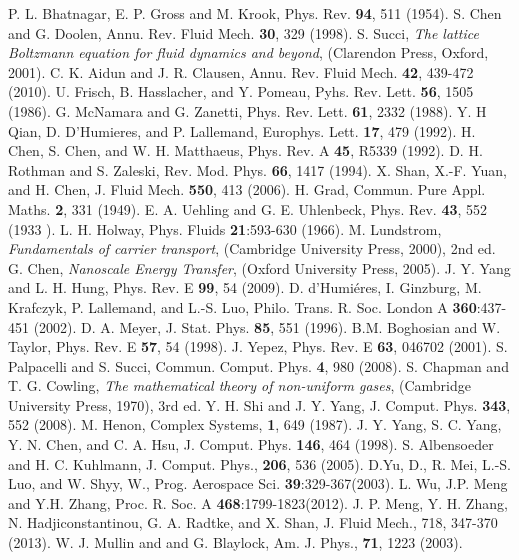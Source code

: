 \documentclass[doublecol]{epl2}
\begin{document}
\begin{thebibliography}{0}

 P. L. Bhatnagar, E. P. Gross and M. Krook, Phys. Rev. {\bf 94}, 511 (1954).
 S. Chen and G. Doolen, Annu. Rev. Fluid Mech. {\bf 30}, 329 (1998).
 S. Succi, {\sl The lattice Boltzmann equation for fluid dynamics and beyond}, (Clarendon Press, Oxford, 2001).
 C. K. Aidun and J. R. Clausen, Annu. Rev. Fluid Mech. {\bf 42}, 439-472 (2010).
 U. Frisch, B. Hasslacher, and Y. Pomeau, Pyhs. Rev. Lett. {\bf 56}, 1505 (1986).
 G. McNamara and G. Zanetti, Phys. Rev. Lett. {\bf 61}, 2332 (1988).
 Y. H Qian, D. D'Humieres, and P. Lallemand, Europhys. Lett. {\bf 17}, 479 (1992).
 H. Chen, S. Chen, and W. H. Matthaeus, Phys. Rev. A {\bf 45}, R5339 (1992).
 D. H. Rothman and S. Zaleski, Rev. Mod. Phys. {\bf 66}, 1417 (1994).
 X. Shan, X.-F. Yuan, and H. Chen, J. Fluid Mech. {\bf 550}, 413 (2006).
 H. Grad, Commun. Pure Appl. Maths. {\bf 2}, 331 (1949).
 E. A. Uehling and G. E. Uhlenbeck, Phys. Rev. {\bf 43}, 552 (1933 ).
 L. H. Holway, Phys. Fluids {\bf 21}:593-630 (1966).
 M. Lundstrom, {\sl Fundamentals of carrier transport}, (Cambridge University Press, 2000), 2nd ed.
 G. Chen, {\sl Nanoscale Energy Transfer}, (Oxford University Press, 2005).
 J. Y. Yang and L. H. Hung, Phys. Rev. E {\bf 99}, 54 (2009).
 D. d'Humi\'{e}res, I. Ginzburg, M. Krafczyk, P. Lallemand, and L.-S. Luo, Philo. Trans. R. Soc. London A {\bf 360}:437-451 (2002).
 D. A. Meyer, J. Stat. Phys. {\bf 85}, 551 (1996).
 B.M. Boghosian and W. Taylor, Phys. Rev. E {\bf 57}, 54 (1998).
 J. Yepez, Phys. Rev. E {\bf 63}, 046702 (2001).
 S. Palpacelli and S. Succi, Commun. Comput. Phys. {\bf 4}, 980 (2008).
 S. Chapman and  T. G. Cowling, {\sl The mathematical theory of non-uniform gases}, (Cambridge University Press, 1970), 3rd ed.
 Y. H. Shi and J. Y. Yang, J. Comput. Phys. {\bf 343}, 552 (2008).
 M. Henon, Complex Systems, {\bf 1}, 649 (1987).
 J. Y. Yang, S. C. Yang, Y. N. Chen, and C. A. Hsu, J. Comput. Phys. {\bf 146}, 464 (1998).
 S. Albensoeder and H. C. Kuhlmann, J. Comput. Phys., {\bf 206}, 536 (2005).
 D.Yu, D., R. Mei, L.-S. Luo, and W. Shyy, W., Prog. Aerospace Sci. {\bf 39}:329-367(2003).
 L. Wu, J.P. Meng  and Y.H. Zhang, Proc. R. Soc. A {\bf 468}:1799-1823(2012).
 J. P. Meng, Y. H. Zhang, N. Hadjiconstantinou, G. A. Radtke, and X. Shan, J. Fluid Mech., 718, 347-370 (2013).
 W. J. Mullin and and G. Blaylock, Am. J. Phys., {\bf 71}, 1223 (2003).

\end{thebibliography}
\end{document}
